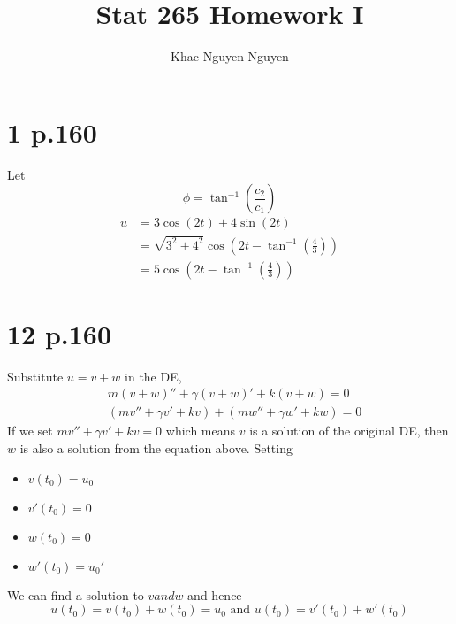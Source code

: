 \documentclass[11pt]{article}
\title{\textbf{Stat 265 Homework I}}
\author{Khac Nguyen Nguyen}
\date{}
\begin{document}
\section*{1 p.160}
Let 
\[
    \phi = \tan^{-1}\left( \frac{c_2}{c_1} \right) 
\]
\begin{equation*}
    \begin{aligned}
        u &= 3\cos(2t) + 4\sin(2t) \\
        &= \sqrt{3^2+4^2} \cos\left(2t - \tan^{-1}\left(\frac{4}{3}\right)\right) \\
        &= 5\cos\left(2t - \tan^{-1}\left(\frac{4}{3}\right)\right)
    \end{aligned}
\end{equation*}
\newpage
\section*{12 p.160}
Substitute $u = v+w$ in the DE,
\begin{equation*}
    \begin{aligned}
        &m(v+w)'' + \gamma(v+w)' + k(v+w) = 0 \\
        &(mv'' + \gamma v' + kv) + (mw'' + \gamma w' + kw) = 0
    \end{aligned}
\end{equation*}
If we set $mv'' + \gamma v' + kv = 0$ which means $v$ is a solution of the original DE,
then $w$ is also a solution from the equation above. Setting 
\begin{itemize}
    \item $v(t_0) = u_0 $
    \item $v'(t_0) = 0 $
    \item $w(t_0) = 0$
    \item $w'(t_0) = u_0'$
\end{itemize}
We can find a solution to $v and w$ and hence 
\[
    u(t_0) = v(t_0) + w(t_0) = u_0 \text{ and } u(t_0) = v'(t_0) + w'(t_0)    
\]
\newpage
\end{document}
